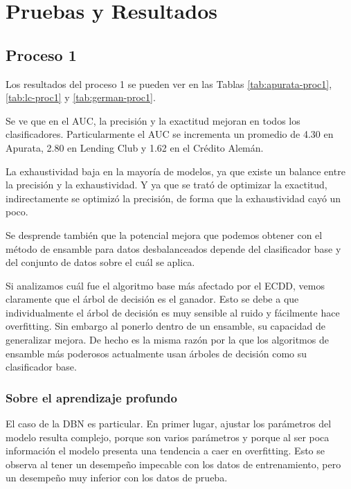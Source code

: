 \chapter{Pruebas y Resultados}

\section{Proceso 1} %

Los resultados del proceso 1 se pueden ver en las Tablas \ref{tab:apurata-proc1}, \ref{tab:lc-proc1} y \ref{tab:german-proc1}.

Se ve que en el \ac{AUC}, la precisión y la exactitud mejoran en todos los clasificadores. Particularmente el AUC se incrementa un promedio de 4.30 en Apurata, 2.80 en Lending Club y 1.62 en el Crédito Alemán.

La exhaustividad baja en la mayoría de modelos, ya que existe un balance entre la precisión y la exhaustividad. Y ya que se trató de optimizar la exactitud, indirectamente se optimizó la precisión, de forma que la exhaustividad cayó un poco.

Se desprende también que la potencial mejora que podemos obtener con el método de ensamble para datos desbalanceados depende del clasificador base y del conjunto de datos sobre el cuál se aplica. 

Si analizamos cuál fue el algoritmo base más afectado por el \ac{ECDD}, vemos claramente que el árbol de decisión es el ganador. Esto se debe a que individualmente el árbol de decisión es muy sensible al ruido y fácilmente hace overfitting. Sin embargo al ponerlo dentro de un ensamble, su capacidad de generalizar mejora. De hecho es la misma razón por la que los algoritmos de ensamble más poderosos actualmente usan árboles de decisión como su clasificador base.

\subsection{Sobre el aprendizaje profundo}

El caso de la \ac{DBN} es particular. En primer lugar, ajustar los parámetros del modelo resulta complejo, porque son varios parámetros y porque al ser poca información el modelo presenta una tendencia a caer en overfitting. Esto se observa al tener un desempeño impecable con los datos de entrenamiento, pero un desempeño muy inferior con los datos de prueba.

